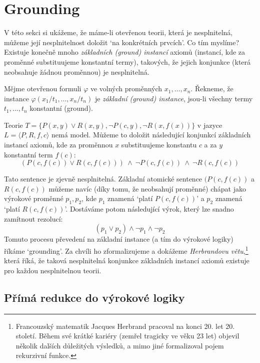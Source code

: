 \section{Grounding}\label{section:grounding}

V této sekci si ukážeme, že máme-li otevřenou teorii, která je nesplnitelná, můžeme její nesplnitelnost doložit `na konkrétních prvcích'. Co tím myslíme? Existuje konečně mnoho \emph{základních (ground) instancí} axiomů (instancí, kde za proměnné substituujeme konstantní termy), takových, že jejich konjunkce (která neobsahuje žádnou proměnnou) je nesplnitelná.

\begin{definition}
    Mějme otevřenou formuli $\varphi$ ve volných proměnných $x_1,\dots,x_n$. Řekneme, že instance $\varphi(x_1/t_1,\dots,x_n/t_n)$ je \emph{základní (ground) instance}, jsou-li všechny termy $t_1,\dots,t_n$ konstantní (ground).
\end{definition}

\begin{example}
    Teorie $T=\{P(x,y)\lor R(x,y),\neg P(c,y),\neg R(x,f(x))\}$ v jazyce $L=\langle P,R,f,c \rangle$ nemá model. Můžeme to doložit následující konjunkcí základních instancí axiomů, kde za proměnnou $x$ substituujeme konstantu $c$ a za $y$ konstantní term $f(c)$:
$$
(P(c,f(c))\lor R(c,f(c)))\ \land\ \neg P(c,f(c))\ \land\ \neg R(c,f(c))
$$
\end{example}
Tato sentence je zjevně nesplnitelná. Základní atomické sentence $(P(c,f(c))$ a $R(c,f(c))$ můžeme navíc (díky tomu, že neobsahují proměnné) chápat jako výrokové proměnné $p_1,p_2$, kde $p_1$ znamená `platí $P(c,f(c))$' a $p_2$ znamená `platí $R(c,f(c))$'. Dostáváme potom následující výrok, který lze snadno zamítnout rezolucí:
$$
(p_1 \lor p_2) \land \neg p_1 \land \neg p_2
$$
Tomuto procesu převedení na základní instance (a tím do výrokové logiky) říkáme `grounding'. Za chvíli ho zformalizujeme a dokážeme \emph{Herbrandovu větu},\footnote{Francouzský matematik Jacques Herbrand pracoval na konci 20. let 20. století. Během své krátké kariéry (zemřel tragicky ve věku 23 let) objevil několik dalších důležitých výsledků, a mimo jiné formalizoval pojem rekurzivní funkce.} která říká, že taková nesplnitelná konjunkce základních instancí axiomů existuje pro každou nesplnitelnou teorii.

\subsection{Přímá redukce do výrokové logiky}

